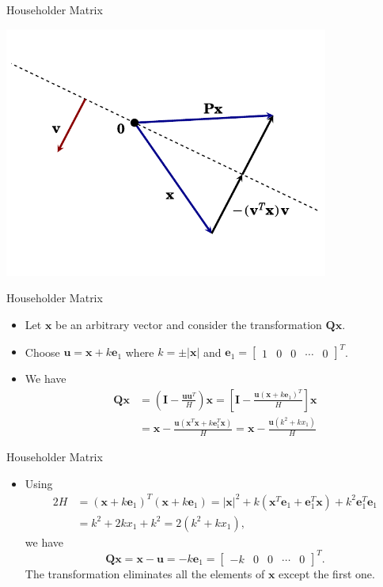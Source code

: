 \documentclass{beamer}
\begin{document}
\begin{frame}{Householder Matrix}
    \centerline{
\includegraphics[width=0.8\textwidth]{hhreflect.pdf}    }
\end{frame}

\begin{frame}{Householder Matrix}
    \begin{itemize}
        \item Let $\mathbf{x}$  be an arbitrary vector and consider the transformation  $\mathbf{Q x}$.
        \item Choose $\mathbf{u}=\mathbf{x}+k \mathbf{e}_1$  where 
$k= \pm|\mathbf{x}|$ and $\mathbf{e}_1=\left[\begin{array}{lllll}
1 & 0 & 0 & \cdots & 0
\end{array}\right]^T $.
\item We have 
\begin{align*}
\mathbf{Q} \mathbf{x} & =\left(\mathbf{I}-\frac{\mathbf{u} \mathbf{u}^T}{H}\right) \mathbf{x}=\left[\mathbf{I}-\frac{\mathbf{u}\left(\mathbf{x}+k \mathbf{e}_1\right)^T}{H}\right] \mathbf{x} \\
& =\mathbf{x}-\frac{\mathbf{u}\left(\mathbf{x}^T \mathbf{x}+k \mathbf{e}_1^T \mathbf{x}\right)}{H}=\mathbf{x}-\frac{\mathbf{u}\left(k^2+k x_1\right)}{H}
\end{align*}

    \end{itemize}
\end{frame}
\begin{frame}{Householder Matrix}
    \begin{itemize}
\item Using 
\begin{align*}
2 H & =\left(\mathbf{x}+k \mathbf{e}_1\right)^T\left(\mathbf{x}+k \mathbf{e}_1\right)=|\mathbf{x}|^2+k\left(\mathbf{x}^T \mathbf{e}_1+\mathbf{e}_1^T \mathbf{x}\right)+k^2 \mathbf{e}_1^T \mathbf{e}_1 \\
& =k^2+2 k x_1+k^2=2\left(k^2+k x_1\right),
\end{align*}
we have 
$$
\mathbf{Q} \mathbf{x}=\mathbf{x}-\mathbf{u}=-k \mathbf{e}_1=\left[\begin{array}{lllll}
-k & 0 & 0 & \cdots & 0
\end{array}\right]^T.
$$
The transformation eliminates all the elements of $\mathbf{x}$ except the first one.
    \end{itemize}
\end{frame}
\end{document}
